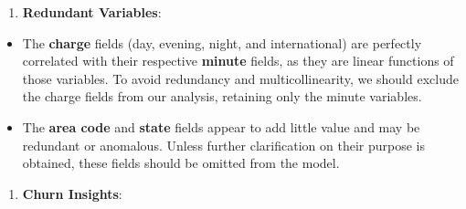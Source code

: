 \documentclass[
]{book}
\providecommand{\tightlist}{%
  \setlength{\itemsep}{0pt}\setlength{\parskip}{0pt}}
\theoremstyle{definition}
\theoremstyle{definition}
\theoremstyle{definition}
\theoremstyle{definition}
\theoremstyle{remark}
\begin{document}
\begin{enumerate}
\def\labelenumi{\arabic{enumi}.}
\tightlist
\item
  \textbf{Redundant Variables}:
\end{enumerate}

\begin{itemize}
\tightlist
\item
  The \textbf{charge} fields (day, evening, night, and international) are perfectly correlated with their respective \textbf{minute} fields, as they are linear functions of those variables. To avoid redundancy and multicollinearity, we should exclude the charge fields from our analysis, retaining only the minute variables.
\item
  The \textbf{area code} and \textbf{state} fields appear to add little value and may be redundant or anomalous. Unless further clarification on their purpose is obtained, these fields should be omitted from the model.
\end{itemize}

\begin{enumerate}
\def\labelenumi{\arabic{enumi}.}
\setcounter{enumi}{1}
\tightlist
\item
  \textbf{Churn Insights}:
\end{enumerate}
\end{document}
